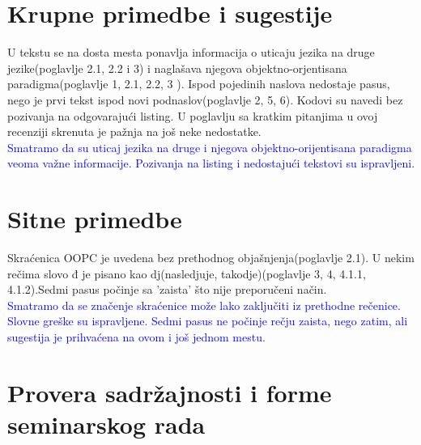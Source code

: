 \documentclass[a4paper]{report}
\newcommand{\odgovor}[1]{\textcolor{blue}{#1}}
\begin{document}
\section{Krupne primedbe i sugestije}
U tekstu se na dosta mesta ponavlja informacija o uticaju jezika na druge jezike(poglavlje 2.1, 2.2 i 3) i naglašava njegova objektno-orjentisana paradigma(poglavlje 1, 2.1, 2.2, 3 ). Ispod pojedinih naslova nedostaje pasus, nego je prvi tekst ispod novi podnaslov(poglavlje 2, 5, 6).  Kodovi su navedi bez pozivanja na odgovarajući listing. U poglavlju sa kratkim pitanjima u ovoj recenziji skrenuta je pažnja na još neke nedostatke. \\
\odgovor{Smatramo da su uticaj jezika na druge i njegova objektno-orijentisana paradigma veoma važne informacije. Pozivanja na listing i nedostajući tekstovi su ispravljeni.}
\section{Sitne primedbe}
Skraćenica OOPC je uvedena bez prethodnog objašnjenja(poglavlje 2.1). U nekim rečima slovo đ je pisano kao dj(nasledjuje, takodje)(poglavlje 3, 4, 4.1.1, 4.1.2).Sedmi pasus počinje sa 'zaista' što nije preporučeni način. \\
\odgovor{Smatramo da se značenje skraćenice može lako zaključiti iz prethodne rečenice. Slovne greške su ispravljene. Sedmi pasus ne počinje rečju zaista, nego zatim, ali sugestija je prihvaćena na ovom i još jednom mestu.}

\section{Provera sadržajnosti i forme seminarskog rada}
\end{document}
